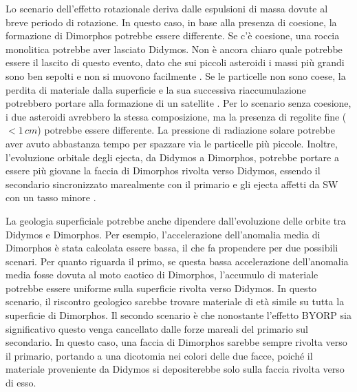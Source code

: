 Lo scenario dell'effetto rotazionale deriva dalle espulsioni di massa dovute al breve periodo di rotazione. In questo caso, in base alla presenza di coesione, la formazione di Dimorphos potrebbe essere differente. Se c'è coesione, una roccia monolitica potrebbe aver lasciato Didymos. Non è ancora chiaro quale potrebbe essere il lascito di questo evento, dato che sui piccoli asteroidi i massi più grandi sono ben sepolti e non si muovono facilmente \citep{daly_hemispherical_2020}. Se le particelle non sono coese, la perdita di materiale dalla superficie e la sua successiva riaccumulazione potrebbero portare alla formazione di un satellite \citep{walsh_spin-up_2012}. Per lo scenario senza coesione, i due asteroidi avrebbero la stessa composizione, ma la presenza di regolite fine ($<1\,cm$) potrebbe essere differente. La pressione di radiazione solare potrebbe aver avuto abbastanza tempo per spazzare via le particelle più piccole. Inoltre, l'evoluzione orbitale degli ejecta, da Didymos a Dimorphos, potrebbe portare a essere più giovane la faccia di Dimorphos rivolta verso Didymos, essendo il secondario sincronizzato marealmente con il primario e gli ejecta affetti da SW con un tasso minore \citep{agrusa_excited_2021}.

La geologia superficiale potrebbe anche dipendere dall'evoluzione delle orbite tra Didymos e Dimorphos. Per esempio, l'accelerazione dell'anomalia media di Dimorphos è stata calcolata essere bassa, il che fa propendere per due possibili scenari. Per quanto riguarda il primo, se questa bassa accelerazione dell'anomalia media fosse dovuta al moto caotico di Dimorphos, l'accumulo di materiale potrebbe essere uniforme sulla superficie rivolta verso Didymos. In questo scenario, il riscontro geologico sarebbe trovare materiale di età simile su tutta la superficie di Dimorphos. Il secondo scenario è che nonostante l'effetto BYORP sia significativo questo venga cancellato dalle forze mareali del primario sul secondario. In questo caso, una faccia di Dimorphos sarebbe sempre rivolta verso il primario, portando a una dicotomia nei colori delle due facce, poiché il materiale proveniente da Didymos si depositerebbe solo sulla faccia rivolta verso di esso.

